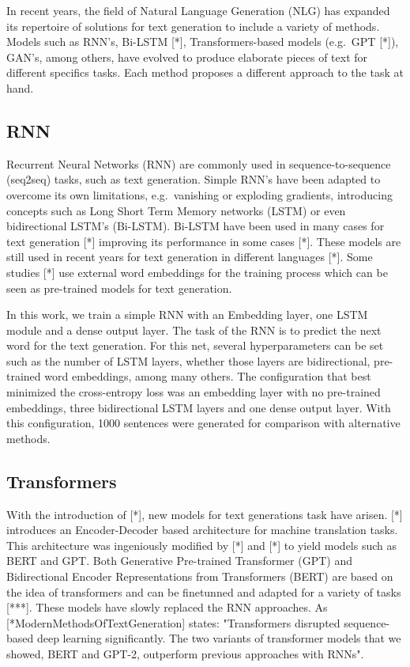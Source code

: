 \documentclass[10pt,twocolumn,letterpaper]{article}
\begin{document}
In recent years, the field of Natural Language Generation (NLG) has expanded its repertoire
of solutions for text generation to include a variety of methods.
Models such as RNN's, Bi-LSTM [*], Transformers-based models (e.g.\ GPT [*]), GAN's, among others, have evolved
to produce elaborate pieces of text for different specifics tasks.
Each method proposes a different approach to the task at hand.

\subsection{RNN}

Recurrent Neural Networks (RNN) are commonly used in sequence-to-sequence (seq2seq) tasks, such as text generation.
Simple RNN's have been adapted to overcome its own limitations, e.g.\ vanishing or exploding gradients,
introducing concepts such as Long Short Term Memory networks (LSTM) or even bidirectional LSTM's (Bi-LSTM).
Bi-LSTM have been used in many cases for text generation [*] improving its performance in some cases [*].
These models are still used in recent years for text generation in different languages [*].
Some studies [*] use external word embeddings for the training process which can be seen as pre-trained
models for text generation.

In this work, we train a simple RNN with an Embedding layer, one LSTM module and a dense output layer.
The task of the RNN is to predict the next word for the text generation.
For this net, several hyperparameters can be set such as the number of LSTM layers, whether those layers
are bidirectional, pre-trained word embeddings, among many others.
The configuration that best minimized the cross-entropy loss was an embedding layer with no pre-trained embeddings,
three bidirectional LSTM layers and one dense output layer.
With this configuration, 1000 sentences were generated for comparison with alternative methods.

\subsection{Transformers}

With the introduction of [*], new models for text generations task have arisen.
[*] introduces an Encoder-Decoder based architecture for machine translation tasks.
This architecture was ingeniously modified by [*] and [*] to yield models such as BERT and GPT.
Both Generative Pre-trained Transformer (GPT) and Bidirectional Encoder Representations from Transformers (BERT)
are based on the idea of transformers and can be finetunned and adapted for a variety of tasks [***].
These models have slowly replaced the RNN approaches.
As [*ModernMethodsOfTextGeneration] states: "Transformers disrupted sequence-based deep learning significantly.
The two variants of transformer models that we showed, BERT and GPT-2, outperform
previous approaches with RNNs".
\end{document}
